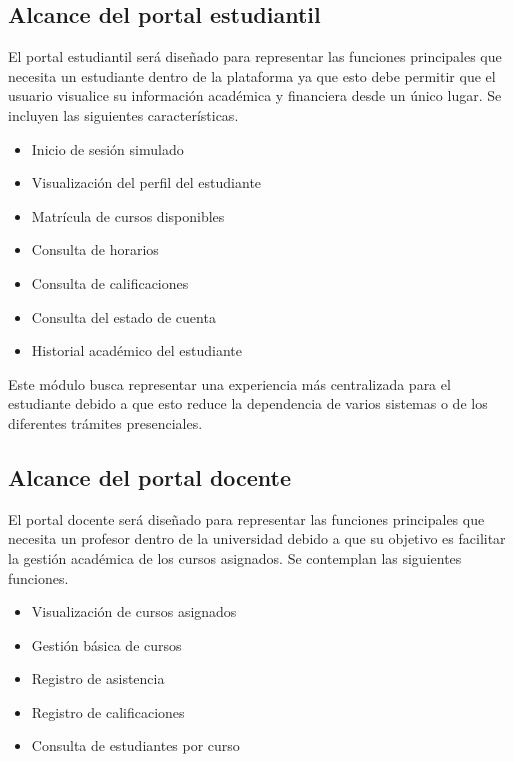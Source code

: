 \documentclass[11pt,spanish]{article}
\begin{document}
\subsection{Alcance del portal estudiantil}

El portal estudiantil será diseñado para representar las funciones principales que necesita un estudiante dentro de la plataforma ya que esto debe permitir que el usuario visualice su información académica y financiera desde un único lugar. Se incluyen las siguientes características.

\begin{itemize}[leftmargin=*]
    \item Inicio de sesión simulado
    \item Visualización del perfil del estudiante
    \item Matrícula de cursos disponibles
    \item Consulta de horarios
    \item Consulta de calificaciones
    \item Consulta del estado de cuenta
    \item Historial académico del estudiante
\end{itemize}

Este módulo busca representar una experiencia más centralizada para el estudiante debido a que esto reduce la dependencia de varios sistemas o de los diferentes trámites presenciales.

\subsection{Alcance del portal docente}

El portal docente será diseñado para representar las funciones principales que necesita un profesor dentro de la universidad debido a que su objetivo es facilitar la gestión académica de los cursos asignados. Se contemplan las siguientes funciones.

\begin{itemize}[leftmargin=*]
    \item Visualización de cursos asignados
    \item Gestión básica de cursos
    \item Registro de asistencia
    \item Registro de calificaciones
    \item Consulta de estudiantes por curso
\end{itemize}
\end{document}

